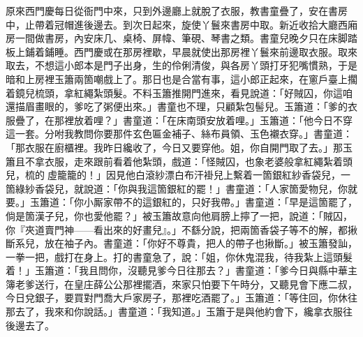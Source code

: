 原來西門慶每日從衙門中來，只到外邊廳上就脫了衣服，教書童疊了，安在書房中，止帶着冠帽進後邊去。到次日起來，旋使丫鬟來書房中取。{}新近收拾大廳西廂房一間做書房，內安床几、桌椅、屏幃、筆硯、琴書之類。書童兒晚夕只在床脚踏板上鋪着鋪睡。西門慶或在那房裡歇，早晨就使出那房裡丫鬟來前邊取衣服。取來取去，不想這小郎本是門子出身，生的伶俐清俊，與各房丫頭打牙犯嘴慣熟，于是暗和上房裡玉簫兩箇嘲戲上了。那日也是合當有事，這小郎正起來，在窻戶臺上擱着鏡兒梳頭，拿紅繩紮頭髮。不料玉簫推開門進來，看見說道：「好賊囚，你這咱還描眉畫眼的，爹吃了粥便出來。」書童也不理，只顧紮包髻兒。玉簫道：「爹的衣服疊了，在那裡放着哩？」書童道：「在床南頭安放着哩。」玉簫道：「他今日不穿這一套。分咐我教問你要那件玄色匾金補子、絲布員領、玉色襯衣穿。」書童道：「那衣服在廚櫃裡。我昨日纔收了，今日又要穿他。姐，你自開門取了去。」那玉簫且不拿衣服，走來跟前看着他紮頭，戲道：「怪賊囚，也象老婆般拿紅繩紮着頭兒，梳的𩬆虛籠籠的！」{}因見他白滾紗漂白布汗褂兒上繫着一箇銀紅紗香袋兒，一箇綠紗香袋兒，就說道：「你與我這箇銀紅的罷！」書童道：「人家箇愛物兒，你就要。」玉簫道：「你小厮家帶不的這銀紅的，只好我帶。」{}書童道：「早是這箇罷了，倘是箇漢子兒，你也愛他罷？」{}被玉簫故意向他肩膀上擰了一把，說道：「賊囚，你『夾道賣門神——看出來的好畫兒』。」不繇分說，把兩箇香袋子等不的解，都揪斷系兒，放在袖子內。{}書童道：「你好不尊貴，把人的帶子也揪斷。」被玉簫發訕，一拳一把，戲打在身上。打的書童急了，說：「姐，你休鬼混我，待我紮上這頭髮着！」玉簫道：「我且問你，沒聽見爹今日往那去？」書童道：「爹今日與縣中華主簿老爹送行，在皇庄薛公公那裡擺酒，來家只怕要下午時分，又聽見會下應二叔，今日兌銀子，要買對門喬大戶家房子，那裡吃酒罷了。」玉簫道：「等住回，你休往那去了，我來和你說話。」書童道：「我知道。」玉簫于是與他約會下，纔拿衣服往後邊去了。

